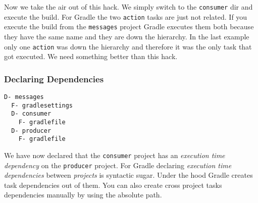 Now we take the air out of this hack. We simply switch to the \texttt{consumer} dir and execute the build.
For Gradle the two \texttt{action} tasks are just not related. If you execute the build from the \texttt{messages} project Gradle executes them both because they have the same name and they are down the hierarchy. In the last example only one \texttt{action} was down the hierarchy and therefore it was the only task that got executed. We need something better than this hack.
\subsubsection{Declaring Dependencies} %
\label{ssub:declaring_dependencies}

\begin{minipage}[t]{7cm}
\begin{Verbatim}[frame=single,label=Project Tree]
D- messages
  F- gradlesettings
  D- consumer
    F- gradlefile
  D- producer
    F- gradlefile	
\end{Verbatim}
\end{minipage}	
\begin{minipage}[t]{9cm}
\end{minipage}

We have now declared that the \texttt{consumer} project has an \emph{execution time dependency} on the \texttt{producer} project. For Gradle declaring \emph{execution time dependencies} between \emph{projects} is syntactic sugar. Under the hood Gradle creates task dependencies out of them. You can also create cross project tasks dependencies manually by using the absolute path. 

